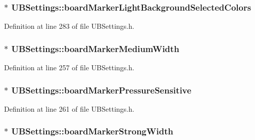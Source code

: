 \hypertarget{class_u_b_settings_ae049f91718c90652014484c99064a452}{
\subsubsection[{board\-Marker\-Light\-Background\-Selected\-Colors}]{$\ast$ U\-B\-Settings\-::board\-Marker\-Light\-Background\-Selected\-Colors}}\label{db/d66/class_u_b_settings_ae049f91718c90652014484c99064a452}


Definition at line 283 of file U\-B\-Settings.\-h.

\hypertarget{class_u_b_settings_a4f8e7aa90ecb8c2c45118961ad182063}{
\subsubsection[{board\-Marker\-Medium\-Width}]{$\ast$ U\-B\-Settings\-::board\-Marker\-Medium\-Width}}\label{db/d66/class_u_b_settings_a4f8e7aa90ecb8c2c45118961ad182063}


Definition at line 257 of file U\-B\-Settings.\-h.

\hypertarget{class_u_b_settings_a661e9108d58aa9374decbbd60ee9dbe4}{
\subsubsection[{board\-Marker\-Pressure\-Sensitive}]{$\ast$ U\-B\-Settings\-::board\-Marker\-Pressure\-Sensitive}}\label{db/d66/class_u_b_settings_a661e9108d58aa9374decbbd60ee9dbe4}


Definition at line 261 of file U\-B\-Settings.\-h.

\hypertarget{class_u_b_settings_a912e41e00b9eecee7f098c44f52713a4}{
\subsubsection[{board\-Marker\-Strong\-Width}]{$\ast$ U\-B\-Settings\-::board\-Marker\-Strong\-Width}}\label{db/d66/class_u_b_settings_a912e41e00b9eecee7f098c44f52713a4}


